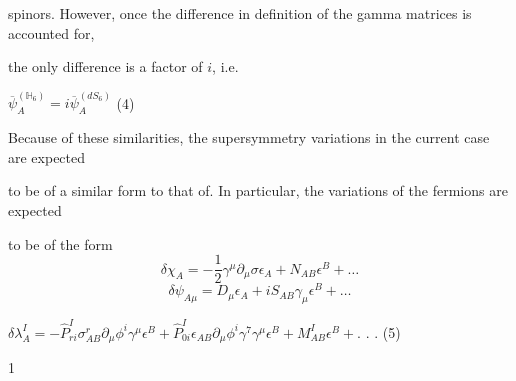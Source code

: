 \documentclass[a4paper,12pt]{article}
\begin{document}
spinors. However, once the difference in definition of the gamma matrices is accounted for,

the only difference is a factor of $i$, i.e.
\begin{center}
$\overline{\psi}_{A}^{(\mathbb{H}_{6})}=i\overline{\psi}_{A}^{(dS_{6})}$   (4)
\end{center}
Because of these similarities, the supersymmetry variations in the current case are expected

to be of a similar form to that of. In particular, the variations of the fermions are expected

to be of the form
$$
\delta\chi_{A}=-\frac{1}{2}\gamma^{\mu}\partial_{\mu}\sigma\epsilon_{A}+N_{AB}\epsilon^{B}+\ldots
$$
$$
\delta\psi_{A\mu}=D_{\mu}\epsilon_{A}+iS_{AB}\gamma_{\mu}\epsilon^{B}+\ldots
$$
\begin{center}
$\delta\lambda_{A}^{I}=-\hat{P}_{ri}^{I}\sigma_{AB}^{r}\partial_{\mu}\phi^{i}\gamma^{\mu}\epsilon^{B}+\hat{P}_{0i}^{I}\epsilon_{AB}\partial_{\mu}\phi^{i}\gamma^{7}\gamma^{\mu}\epsilon^{B}+M_{AB}^{I}\epsilon^{B}+.$ . .   (5)
\end{center}
1
\end{document}
